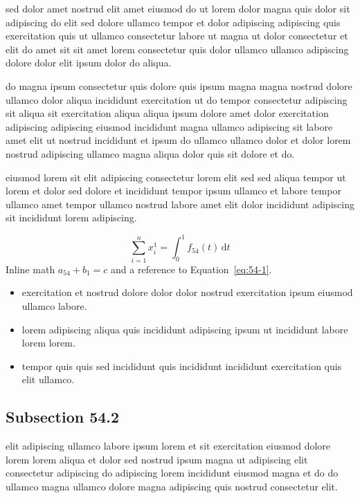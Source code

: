 \documentclass{article}
\begin{document}
sed dolor amet nostrud elit amet eiusmod do ut lorem dolor magna quis dolor sit adipiscing do elit sed dolore ullamco tempor et dolor adipiscing adipiscing quis exercitation quis ut ullamco consectetur labore ut magna ut dolor consectetur et elit do amet sit sit amet lorem consectetur quis dolor ullamco ullamco adipiscing dolore dolor elit ipsum dolor do aliqua.

do magna ipsum consectetur quis dolore quis ipsum magna magna nostrud dolore ullamco dolor aliqua incididunt exercitation ut do tempor consectetur adipiscing sit aliqua sit exercitation aliqua aliqua ipsum dolore amet dolor exercitation adipiscing adipiscing eiusmod incididunt magna ullamco adipiscing sit labore amet elit ut nostrud incididunt et ipsum do ullamco ullamco dolor et dolor lorem nostrud adipiscing ullamco magna aliqua dolor quis sit dolore et do.

eiusmod lorem sit elit adipiscing consectetur lorem elit sed sed aliqua tempor ut lorem et dolor sed dolore et incididunt tempor ipsum ullamco et labore tempor ullamco amet tempor ullamco nostrud labore amet elit dolor incididunt adipiscing sit incididunt lorem adipiscing.

\begin{equation}\label{eq:54-1}
  \sum_{i=1}^{n} x_i^{1} = \int_0^1 f_{54}(t)\,\mathrm{d}t
\end{equation}
Inline math $a_{54} + b_{1} = c$ and a reference to Equation~\eqref{eq:54-1}.

\begin{itemize}
  \item exercitation et nostrud dolore dolor dolor nostrud exercitation ipsum eiusmod ullamco labore.
  \item lorem adipiscing aliqua quis incididunt adipiscing ipsum ut incididunt labore lorem lorem.
  \item tempor quis quis sed incididunt quis incididunt incididunt exercitation quis elit ullamco.
\end{itemize}

\subsection{Subsection 54.2}\label{sec:54-2}
elit adipiscing ullamco labore ipsum lorem et sit exercitation eiusmod dolore lorem lorem aliqua et dolor sed nostrud ipsum magna ut adipiscing elit consectetur adipiscing do adipiscing lorem incididunt eiusmod magna et do do ullamco magna ullamco dolore magna adipiscing quis nostrud consectetur elit.
\end{document}
